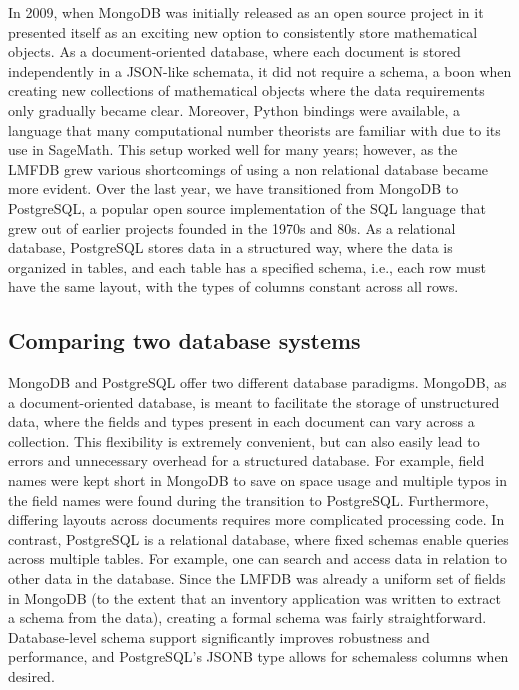 \documentclass{article}
\begin{document}
In 2009, when MongoDB was initially released as an open source project in it presented itself as an exciting new option to consistently store mathematical objects.
As a document-oriented database, where each document is stored independently in a JSON-like schemata, it did not require a schema, a boon when creating new collections of mathematical objects where the data requirements only gradually became clear.
Moreover, Python bindings were available, a language that many computational number theorists are familiar with due to its use in SageMath.
This setup worked well for many years; however, as the LMFDB grew various shortcomings of using a non relational database became more evident.
Over the last year, we have transitioned from MongoDB to PostgreSQL, a popular open source implementation of the SQL language that grew out of earlier projects founded in the 1970s and 80s.
As a relational database, PostgreSQL stores data in a structured way, where the data is organized in tables, and each table has a specified schema, i.e., each row must have the same layout, with the types of columns constant across all rows.

\subsection{Comparing two database systems}

MongoDB and PostgreSQL offer two different database paradigms.
MongoDB, as a document-oriented database, is meant to facilitate the storage of unstructured data, where the fields and types present in each document can vary across a collection.
This flexibility is extremely convenient, but can also easily lead to errors and unnecessary overhead for a structured database.
For example, field names were kept short in MongoDB to save on space usage and multiple typos in the field names were found during the transition to PostgreSQL.
Furthermore, differing layouts across documents requires more complicated processing code.
In contrast, PostgreSQL is a relational database, where fixed schemas enable queries across multiple tables.
For example, one can search and access data in relation to other data in the database.
Since the LMFDB was already a uniform set of fields in MongoDB (to the extent that an inventory application was written to extract a schema from the data), creating a formal schema was fairly straightforward.
Database-level schema support significantly improves robustness and performance, and PostgreSQL's JSONB type allows for schemaless columns when desired.
\end{document}
